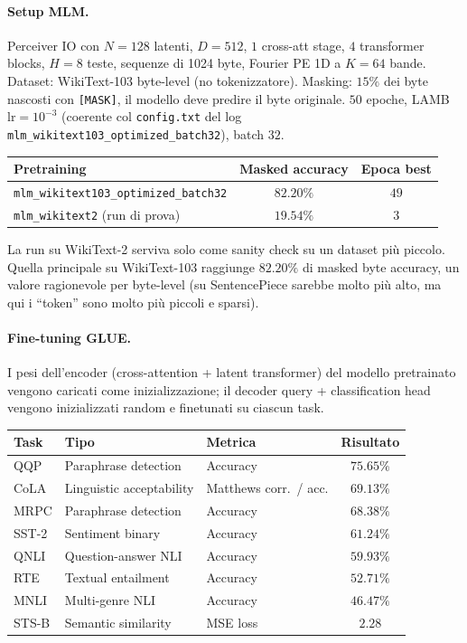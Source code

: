 \documentclass[
  11pt,
]{article}
\begin{document}
\paragraph{Setup MLM.} Perceiver IO con $N=128$ latenti, $D=512$, $1$ cross-att stage, $4$ transformer blocks, $H=8$ teste, sequenze di 1024 byte, Fourier PE 1D a $K=64$ bande. Dataset: WikiText-103 byte-level (no tokenizzatore). Masking: $15\%$ dei byte nascosti con \texttt{[MASK]}, il modello deve predire il byte originale. $50$ epoche, LAMB $\text{lr}=10^{-3}$ (coerente col \texttt{config.txt} del log \texttt{mlm\_wikitext103\_optimized\_batch32}), batch $32$.

\begin{center}
{\small
\begin{tabular}{@{}lcc@{}}
\toprule
\textbf{Pretraining} & \textbf{Masked accuracy} & \textbf{Epoca best} \\
\midrule
\texttt{mlm\_wikitext103\_optimized\_batch32} & $\mathbf{82.20\%}$ & $49$ \\[2pt]
\texttt{mlm\_wikitext2} (run di prova) & $19.54\%$ & $3$ \\
\bottomrule
\end{tabular}
}
\end{center}

La run su WikiText-2 serviva solo come sanity check su un dataset più piccolo. Quella principale su WikiText-103 raggiunge $82.20\%$ di masked byte accuracy, un valore ragionevole per byte-level (su SentencePiece sarebbe molto più alto, ma qui i ``token'' sono molto più piccoli e sparsi).

\paragraph{Fine-tuning GLUE.} I pesi dell'encoder (cross-attention + latent transformer) del modello pretrainato vengono caricati come inizializzazione; il decoder query + classification head vengono inizializzati random e finetunati su ciascun task.

\begin{center}
{\small
\begin{tabular}{@{}lllc@{}}
\toprule
\textbf{Task} & \textbf{Tipo} & \textbf{Metrica} & \textbf{Risultato} \\
\midrule
QQP & Paraphrase detection & Accuracy & $\mathbf{75.65\%}$ \\[2pt]
CoLA & Linguistic acceptability & Matthews corr.\ / acc. & $69.13\%$ \\[2pt]
MRPC & Paraphrase detection & Accuracy & $68.38\%$ \\[2pt]
SST-2 & Sentiment binary & Accuracy & $61.24\%$ \\[2pt]
QNLI & Question-answer NLI & Accuracy & $59.93\%$ \\[2pt]
RTE & Textual entailment & Accuracy & $52.71\%$ \\[2pt]
MNLI & Multi-genre NLI & Accuracy & $46.47\%$ \\[2pt]
STS-B & Semantic similarity & MSE loss & $2.28$ \\
\bottomrule
\end{tabular}
}
\end{center}
\end{document}

